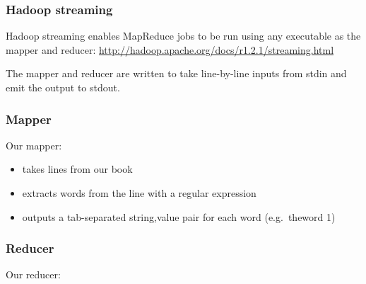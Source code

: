 \subsubsection{Hadoop streaming}\label{hadoop-streaming}

Hadoop streaming enables MapReduce jobs to be run using any executable
as the mapper and reducer:
\url{http://hadoop.apache.org/docs/r1.2.1/streaming.html}

The mapper and reducer are written to take line-by-line inputs from
stdin and emit the output to stdout.

\subsubsection{Mapper}\label{mapper}

Our mapper:

\begin{itemize}
\itemsep1pt\parskip0pt
\item
  takes lines from our book
\item
  extracts words from the line with a regular expression
\item
  outputs a tab-separated string,value pair for each word (e.g.~theword
  1)
\end{itemize}

\begin{Shaded}
\begin{Highlighting}[]

 
 

 
    \NormalTok{(}\NormalTok{)}
     
         
              \NormalTok{+ }

\end{Highlighting}
\end{Shaded}

\subsubsection{Reducer}\label{reducer}

Our reducer:

